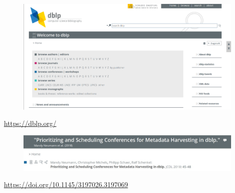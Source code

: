 \documentclass[xcolor={svgnames}]{beamer}
\makeatletter
\newcommand*{\currentname}{\@currentlabelname}
\makeatother
\begin{document}
\begin{frame}{\currentname}\linespread{1.5}
    \begin{figure}
      \begin{center}
        \includegraphics[width=\textwidth,height=0.6\textheight,keepaspectratio]{img/dblp_main.png}
      \end{center}
    \end{figure}
    \url{https://dblp.org/}
\end{frame}

\begin{frame}{\currentname}\linespread{1.5}
    \begin{figure}
      \begin{center}
        \includegraphics[width=\textwidth,height=0.6\textheight,keepaspectratio]{img/this_paper.eps}
      \end{center}
    \end{figure}
    \url{https://doi.org/10.1145/3197026.3197069}
\end{frame}
\end{document}
